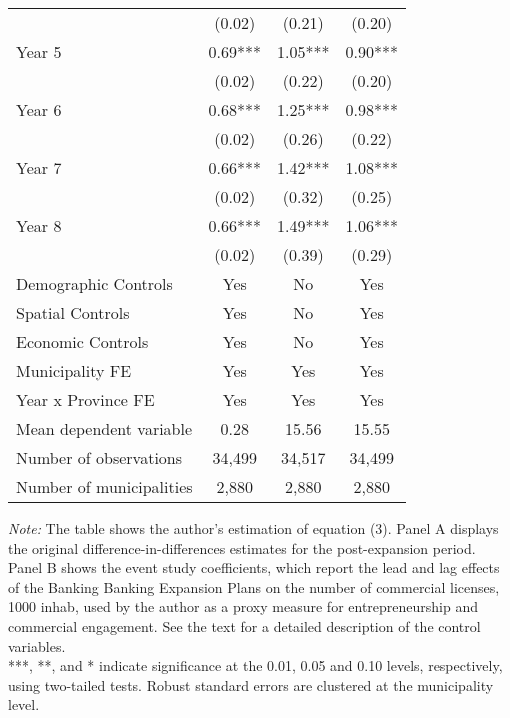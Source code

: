 \begin{table}[H]
{\begin{threeparttable}
\begin{tabular}[t]{lccc}
 & (0.02) & (0.21) & (0.20)\\
Year 5 & 0.69*** & 1.05*** & 0.90***\\
 & (0.02) & (0.22) & (0.20)\\
Year 6 & 0.68*** & 1.25*** & 0.98***\\
 & (0.02) & (0.26) & (0.22)\\
Year 7 & 0.66*** & 1.42*** & 1.08***\\
 & (0.02) & (0.32) & (0.25)\\
Year 8 & 0.66*** & 1.49*** & 1.06***\\
 & (0.02) & (0.39) & (0.29)\\
\midrule
Demographic Controls & Yes & No & Yes\\
Spatial Controls & Yes & No & Yes\\
Economic Controls & Yes & No & Yes\\
\midrule
Municipality FE & Yes & Yes & Yes\\
Year x Province FE & Yes & Yes & Yes\\
\midrule
Mean dependent variable & 0.28 & 15.56 & 15.55\\
Number of observations & 34,499 & 34,517 & 34,499\\
Number of municipalities & 2,880 & 2,880 & 2,880\\
\bottomrule
\end{tabular}
\begin{tablenotes}[para]
\item \footnotesize \textit{Note:} The table shows the author's estimation of equation (3). Panel A 
      displays the original difference-in-differences estimates for the post-expansion period. Panel B shows the event study coefficients,
      which report the lead and lag effects of the Banking Banking Expansion Plans on the number of commercial licenses, 1000 inhab, 
      used by the author as a proxy measure for entrepreneurship and commercial engagement. See the text for a detailed description of the control variables.   \\
      ***, **, and *
      indicate significance at the 0.01, 0.05 and 0.10 levels, respectively, using two-tailed tests. Robust standard errors are clustered
      at the municipality level.
\end{tablenotes}
\end{threeparttable}}
\end{table}
